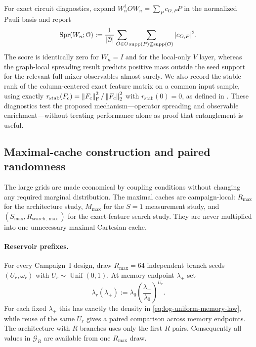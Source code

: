 For exact circuit diagnostics, expand
$W_n^\dagger O W_n=\sum_P c_{O,P}P$ in the normalized Pauli basis and report
\begin{equation}
    \operatorname{Spr}(W_n;\mathcal O)
      :=\frac{1}{|\mathcal O|}
        \sum_{O\in\mathcal O}
        \sum_{\operatorname{supp}(P)\not\subseteq\operatorname{supp}(O)}
          |c_{O,P}|^2.
    \label{eq:app-pauli-spread-score}
\end{equation}
The score is identically zero for $W_n=I$ and for the local-only $V$ layer,
whereas the graph-local spreading result predicts positive mass outside the
seed support for the relevant full-mixer observables almost surely.  We also record the stable rank of the column-centered exact feature
matrix on a common input sample, using exactly
$r_{\mathrm{stab}}(F_c)=\left\lVert F_c\right\rVert_{\mathrm F}^2/\left\lVert F_c\right\rVert_2^2$ with
$r_{\mathrm{stab}}(0)=0$, as defined in .  These diagnostics test the proposed
mechanism---operator spreading and observable enrichment---without treating
performance alone as proof that entanglement is useful.

\subsection{Maximal-cache construction and paired randomness}
\label{app:maximal-cache}

The large grids are made economical by coupling conditions without changing
any required marginal distribution.  The maximal caches are campaign-local:
$R_{\max}$ for the architecture study, $M_{\max}$ for the $S=1$ measurement
study, and $(S_{\max},R_{\mathrm{search},\max})$ for the exact-feature search
study.  They are never multiplied into one unnecessary maximal Cartesian
cache.

\paragraph{Reservoir prefixes.}
For every Campaign~I design, draw $R_{\max}=64$ independent branch seeds
$(U_r,\omega_r)$ with $U_r\sim\operatorname{Unif}(0,1)$.  At memory endpoint
$\lambda_+$ set
\begin{equation}
    \lambda_r(\lambda_+)
      :=\lambda_0
        \left(\frac{\lambda_+}{\lambda_0}\right)^{U_r}.
    \label{eq:coupled-lambda-draw}
\end{equation}
For each fixed $\lambda_+$ this has exactly the density in
\cref{eq:log-uniform-memory-law}, while reuse of the same $U_r$ gives a paired
comparison across memory endpoints.  The architecture with $R$ branches uses
only the first $R$ pairs.  Consequently all values in $\mathcal G_R$ are
available from one $R_{\max}$ draw.

